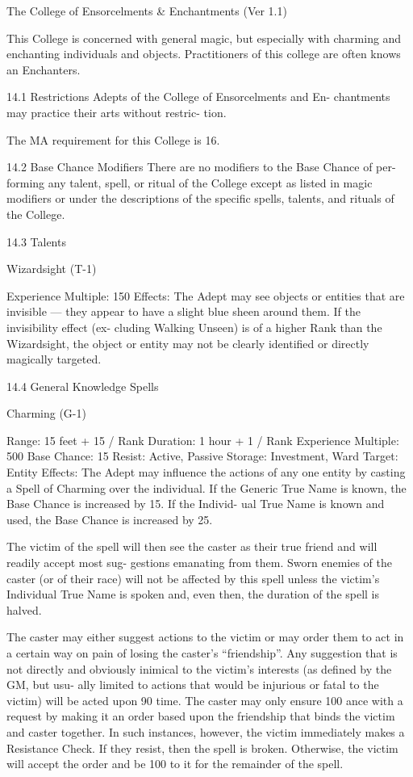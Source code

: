 \begin{Chapter}{The College of Ensorcelments \& Enchantments (Ver 1.1)}

This College is concerned with general magic, but especially with
charming and enchanting individuals and objects.  Practitioners of
this college are often knows an Enchanters.

14.1 Restrictions 
Adepts  of  the  College  of  Ensorcelments  and  En-
chantments may  practice  their  arts  without  restric-
tion. 

The MA requirement for this College is 16. 

14.2 Base Chance Modifiers 
There are no modifiers to the Base Chance of per-
forming  any  talent,  spell,  or  ritual  of  the  College 
except  as  listed  in  magic  modifiers  or  under  the 
descriptions  of  the  specific  spells,  talents,  and 
rituals of the College. 

14.3 Talents  

Wizardsight (T-1) 

Experience Multiple: 150 
Effects: The Adept may see objects or entities that 
are  invisible  —  they  appear  to  have  a  slight  blue 
sheen  around  them.  If  the  invisibility  effect  (ex-
cluding Walking Unseen) is of a higher Rank than 
the  Wizardsight,  the  object  or  entity  may  not  be 
clearly identified or directly magically targeted. 

14.4 General Knowledge Spells 

Charming (G-1) 

Range: 15 feet + 15 / Rank 
Duration: 1 hour + 1 / Rank 
Experience Multiple: 500 
Base Chance: 15%
Resist: Active, Passive 
Storage: Investment, Ward 
Target: Entity 
Effects:  The  Adept  may  influence  the  actions  of 
any one entity by casting a Spell of Charming over 
the individual. If the Generic True Name is known, 
the Base Chance is increased by 15. If the Individ-
ual  True  Name  is  known  and  used,  the  Base 
Chance is increased by 25. 

The  victim  of  the  spell  will  then  see  the  caster  as 
their  true  friend  and  will  readily  accept  most  sug-
gestions  emanating  from  them.  Sworn  enemies  of 
the caster (or of their race) will not be affected by 
this spell unless the victim’s Individual True Name 
is  spoken  and,  even  then,  the  duration  of  the  spell 
is halved. 

The caster may either suggest actions to the victim 
or  may  order  them to  act in  a  certain  way  on  pain 
of losing the caster’s “friendship”. Any suggestion 
that  is  not  directly  and  obviously  inimical  to  the 
victim’s  interests  (as  defined  by  the  GM,  but usu-
ally  limited  to  actions  that  would  be  injurious  or 
fatal  to  the  victim)  will  be  acted  upon  90%
time.  The  caster  may  only  ensure  100%
ance  with  a  request  by  making  it  an  order  based 
upon the friendship that binds the victim and caster 
together.  In  such  instances,  however,  the  victim 
immediately  makes  a  Resistance  Check.  If  they 
resist,  then  the  spell  is  broken.  Otherwise,  the 
victim  will  accept  the  order  and  be  100%
to it for the remainder of the spell. 


\end{Chapter}
